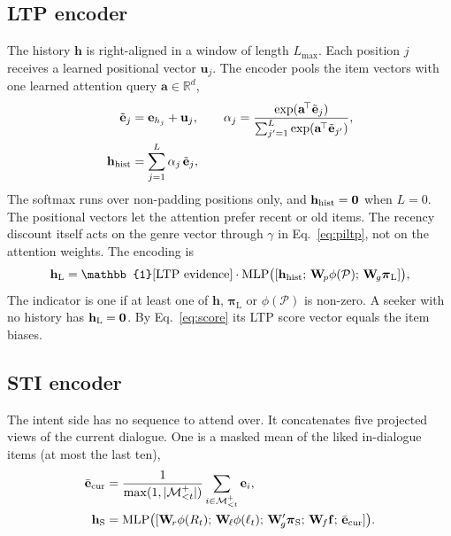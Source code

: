 \subsection{LTP encoder}
\label{sec:ltp}
The history $\mathbf{h}$ is right-aligned in a window of length $L_{\max}$. Each position $j$ receives a learned positional vector $\mathbf{u}_j$. The encoder pools the item vectors with one learned attention query $\mathbf{a}\in\mathbb{R}^{d}$,
\begin{align}
  \tilde{\mathbf{e}}_j &= \mathbf{e}_{h_j}+\mathbf{u}_j, \qquad
  \alpha_j = \frac{\exp(\mathbf{a}^{\!\top}\tilde{\mathbf{e}}_j)}{\sum_{j'=1}^{L}\exp(\mathbf{a}^{\!\top}\tilde{\mathbf{e}}_{j'})}, \label{eq:att}\\
  \mathbf{h}_{\mathrm{hist}} &= \sum_{j=1}^{L}\alpha_j\,\tilde{\mathbf{e}}_j , \label{eq:hist}
\end{align}
The softmax runs over non-padding positions only, and $\mathbf{h}_{\mathrm{hist}}=\mathbf{0}$ when $L=0$. The positional vectors let the attention prefer recent or old items. The recency discount itself acts on the genre vector through $\gamma$ in Eq.~\eqref{eq:piltp}, not on the attention weights. The encoding is
\begin{equation}
  \label{eq:hltp}
  \vh_{\mathrm{L}}=\mathbb{1}[\text{LTP evidence}]\cdot\mathrm{MLP}\big([\vh_{\mathrm{hist}};\,\mathbf{W}_{\!p}\phi(\mathcal{P});\,\mathbf{W}_{\!g}\boldsymbol{\pi}_{\mathrm{L}}]\big),
\end{equation}
The indicator is one if at least one of $\mathbf{h}$, $\boldsymbol{\pi}_{\mathrm{L}}$ or $\phi(\mathcal{P})$ is non-zero. A seeker with no history has $\mathbf{h}_{\mathrm{L}}=\mathbf{0}$. By Eq.~\eqref{eq:score} its LTP score vector equals the item biases.

\subsection{STI encoder}
The intent side has no sequence to attend over. It concatenates five projected views of the current dialogue. One is a masked mean of the liked in-dialogue items (at most the last ten),
\begin{align}
  \bar{\mathbf{e}}_{\mathrm{cur}} &= \frac{1}{\max(1,|\mathcal{M}^{+}_{<t}|)}\sum_{i\in\mathcal{M}^{+}_{<t}}\mathbf{e}_i , \label{eq:cur}\\
  \mathbf{h}_{\mathrm{S}} &= \mathrm{MLP}\big([\mathbf{W}_{\!r}\phi(R_t);\,\mathbf{W}_{\!\ell}\phi(\ell_t);\,\mathbf{W}_{\!g}'\boldsymbol{\pi}_{\mathrm{S}};\,\mathbf{W}_{\!f}\mathbf{f};\,\bar{\mathbf{e}}_{\mathrm{cur}}]\big). \label{eq:hsti}
\end{align}

